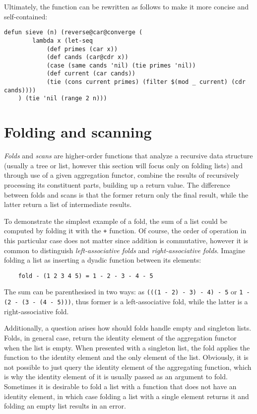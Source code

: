 Ultimately, the function can be rewritten as follows to make it more concise and self-contained:

\begin{Verbatim}
defun sieve (n) (reverse@car@converge (
        lambda x (let-seq
            (def primes (car x))
            (def cands (car@cdr x))
            (case (same cands 'nil) (tie primes 'nil))
            (def current (car cands))
            (tie (cons current primes) (filter $(mod _ current) (cdr cands))))
    ) (tie 'nil (range 2 n)))
\end{Verbatim}

\section{Folding and scanning}

\textit{Folds} and \textit{scans} are higher-order functions that analyze a recursive data structure (usually a tree or list, however this section will focus only on folding lists) and through use of a given aggregation functor, combine the results of recursively processing its constituent parts, building up a return value. The difference between folds and scans is that the former return only the final result, while the latter return a list of intermediate results.

To demonstrate the simplest example of a fold, the sum of a list could be computed by folding it with the \verb|+| function. Of course, the order of operation in this particular case does not matter since addition is commutative, however it is common to distinguish \textit{left-associative folds} and \textit{right-associative folds}. Imagine folding a list as inserting a dyadic function between its elements:

\begin{Verbatim}
    fold - (1 2 3 4 5) = 1 - 2 - 3 - 4 - 5
\end{Verbatim}

The sum can be parenthesised in two ways: as \verb |(((1 - 2) - 3) - 4) - 5| or \verb|1 - (2 - (3 - (4 - 5)))|, thus former is a left-associative fold, while the latter is a right-associative fold.

Additionally, a question arises how should folds handle empty and singleton lists. Folds, in general case, return the identity element of the aggregation functor when the list is empty. When presented with a singleton list, the fold applies the function to the identity element and the only element of the list. Obviously, it is not possible to just query the identity element of the aggregating function, which is why the identity element of it is usually passed as an argument to fold. Sometimes it is desirable to fold a list with a function that does not have an identity element, in which case folding a list with a single element returns it and folding an empty list results in an error.

